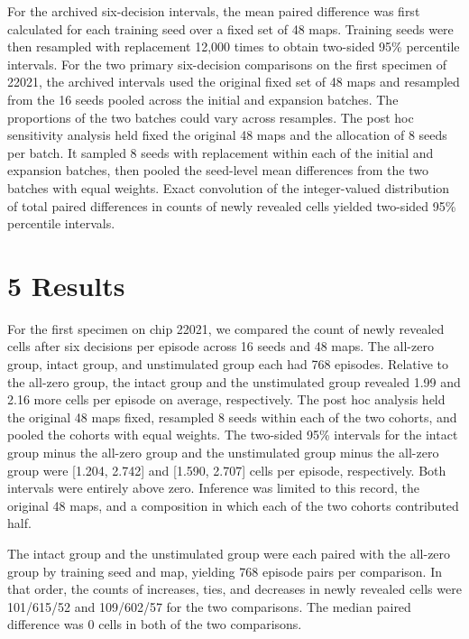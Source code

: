 \documentclass{article}
\begin{document}
For the archived six-decision intervals, the mean paired difference was first calculated for each training seed over a fixed set of 48 maps. Training seeds were then resampled with replacement 12,000 times to obtain two-sided 95\% percentile intervals. For the two primary six-decision comparisons on the first specimen of 22021, the archived intervals used the original fixed set of 48 maps and resampled from the 16 seeds pooled across the initial and expansion batches. The proportions of the two batches could vary across resamples. The post hoc sensitivity analysis held fixed the original 48 maps and the allocation of 8 seeds per batch. It sampled 8 seeds with replacement within each of the initial and expansion batches, then pooled the seed-level mean differences from the two batches with equal weights. Exact convolution of the integer-valued distribution of total paired differences in counts of newly revealed cells yielded two-sided 95\% percentile intervals.


\section*{5 Results}

For the first specimen on chip 22021, we compared the count of newly revealed cells after six decisions per episode across 16 seeds and 48 maps. The all-zero group, intact group, and unstimulated group each had 768 episodes. Relative to the all-zero group, the intact group and the unstimulated group revealed 1.99 and 2.16 more cells per episode on average, respectively. The post hoc analysis held the original 48 maps fixed, resampled 8 seeds within each of the two cohorts, and pooled the cohorts with equal weights. The two-sided 95\% intervals for the intact group minus the all-zero group and the unstimulated group minus the all-zero group were [1.204, 2.742] and [1.590, 2.707] cells per episode, respectively. Both intervals were entirely above zero. Inference was limited to this record, the original 48 maps, and a composition in which each of the two cohorts contributed half.


The intact group and the unstimulated group were each paired with the all-zero group by training seed and map, yielding 768 episode pairs per comparison. In that order, the counts of increases, ties, and decreases in newly revealed cells were 101/615/52 and 109/602/57 for the two comparisons. The median paired difference was 0 cells in both of the two comparisons.
\end{document}
